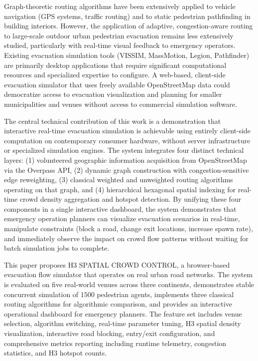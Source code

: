 \documentclass[conference]{IEEEtran}
\begin{document}
Graph-theoretic routing algorithms have been extensively applied to vehicle navigation (GPS systems, traffic routing) and to static pedestrian pathfinding in building interiors. However, the application of adaptive, congestion-aware routing to large-scale outdoor urban pedestrian evacuation remains less extensively studied, particularly with real-time visual feedback to emergency operators. Existing evacuation simulation tools (VISSIM, MassMotion, Legion, Pathfinder) are primarily desktop applications that require significant computational resources and specialized expertise to configure. A web-based, client-side evacuation simulator that uses freely available OpenStreetMap data could democratize access to evacuation visualization and planning for smaller municipalities and venues without access to commercial simulation software.

The central technical contribution of this work is a demonstration that interactive real-time evacuation simulation is achievable using entirely client-side computation on contemporary consumer hardware, without server infrastructure or specialized simulation engines. The system integrates four distinct technical layers: (1) volunteered geographic information acquisition from OpenStreetMap via the Overpass API, (2) dynamic graph construction with congestion-sensitive edge reweighting, (3) classical weighted and unweighted routing algorithms operating on that graph, and (4) hierarchical hexagonal spatial indexing for real-time crowd density aggregation and hotspot detection. By unifying these four components in a single interactive dashboard, the system demonstrates that emergency operation planners can visualize evacuation scenarios in real-time, manipulate constraints (block a road, change exit locations, increase spawn rate), and immediately observe the impact on crowd flow patterns without waiting for batch simulation jobs to complete.

This paper proposes H3 SPATIAL CROWD CONTROL, a browser-based evacuation flow simulator that operates on real urban road networks. The system is evaluated on five real-world venues across three continents, demonstrates stable concurrent simulation of $1500$ pedestrian agents, implements three classical routing algorithms for algorithmic comparison, and provides an interactive operational dashboard for emergency planners. The feature set includes venue selection, algorithm switching, real-time parameter tuning, H3 spatial density visualization, interactive road blocking, entry/exit configuration, and comprehensive metrics reporting including runtime telemetry, congestion statistics, and H3 hotspot counts.
\end{document}
